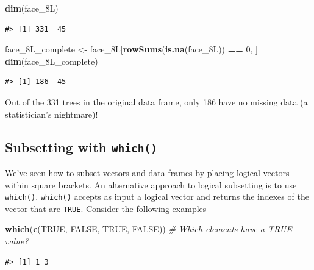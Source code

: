 \documentclass[
  11pt,
]{krantz}
\newenvironment{Shaded}{\begin{snugshade}}{\end{snugshade}}
\newcommand{\CommentTok}[1]{\textcolor[rgb]{0.56,0.35,0.01}{\textit{#1}}}
\newcommand{\DecValTok}[1]{\textcolor[rgb]{0.00,0.00,0.81}{#1}}
\newcommand{\KeywordTok}[1]{\textcolor[rgb]{0.13,0.29,0.53}{\textbf{#1}}}
\newcommand{\NormalTok}[1]{#1}
\newcommand{\OperatorTok}[1]{\textcolor[rgb]{0.81,0.36,0.00}{\textbf{#1}}}
\newcommand{\OtherTok}[1]{\textcolor[rgb]{0.56,0.35,0.01}{#1}}
\newcommand{\StringTok}[1]{\textcolor[rgb]{0.31,0.60,0.02}{#1}}
\theoremstyle{definition}
\theoremstyle{definition}
\theoremstyle{definition}
\theoremstyle{definition}
\theoremstyle{remark}
\begin{document}
\begin{Shaded}
\begin{Highlighting}[]
\KeywordTok{dim}\NormalTok{(face\_8L)}
\end{Highlighting}
\end{Shaded}

\begin{verbatim}
#> [1] 331  45
\end{verbatim}

\begin{Shaded}
\begin{Highlighting}[]
\NormalTok{face\_8L\_complete \textless{}{-}}\StringTok{ }\NormalTok{face\_8L[}\KeywordTok{rowSums}\NormalTok{(}\KeywordTok{is.na}\NormalTok{(face\_8L)) }\OperatorTok{==}\StringTok{ }\DecValTok{0}\NormalTok{, ]}
\KeywordTok{dim}\NormalTok{(face\_8L\_complete)}
\end{Highlighting}
\end{Shaded}

\begin{verbatim}
#> [1] 186  45
\end{verbatim}

Out of the 331 trees in the original data frame, only 186 have no missing data (a statistician's nightmare)!

\hypertarget{which}{%
\subsection{\texorpdfstring{Subsetting with \texttt{which()}}{Subsetting with which()}}\label{which}}

We've seen how to subset vectors and data frames by placing logical vectors within square brackets. An alternative approach to logical subsetting is to use \texttt{which()}. \texttt{which()} accepts as input a logical vector and returns the indexes of the vector that are \texttt{TRUE}. Consider the following examples

\begin{Shaded}
\begin{Highlighting}[]
\KeywordTok{which}\NormalTok{(}\KeywordTok{c}\NormalTok{(}\OtherTok{TRUE}\NormalTok{, }\OtherTok{FALSE}\NormalTok{, }\OtherTok{TRUE}\NormalTok{, }\OtherTok{FALSE}\NormalTok{)) }\CommentTok{\# Which elements have a TRUE value?}
\end{Highlighting}
\end{Shaded}

\begin{verbatim}
#> [1] 1 3
\end{verbatim}
\end{document}
